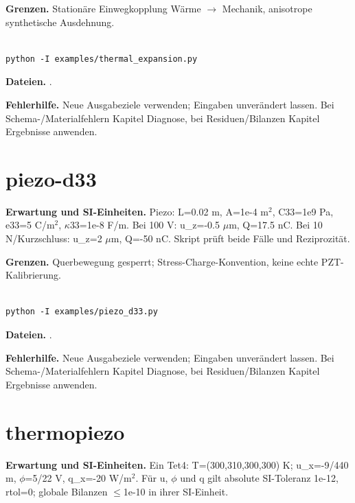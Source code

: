 \textbf{Grenzen.} Stationäre Einwegkopplung Wärme $\rightarrow$ Mechanik, anisotrope synthetische Ausdehnung.

\begin{lstlisting}

python -I examples/thermal_expansion.py

\end{lstlisting}

\textbf{Dateien.} .

\textbf{Fehlerhilfe.} Neue Ausgabeziele verwenden; Eingaben unverändert lassen. Bei Schema-/Materialfehlern Kapitel Diagnose, bei Residuen/Bilanzen Kapitel Ergebnisse anwenden.



\section{piezo-d33}\label{recipe:piezo-d33}

\textbf{Erwartung und SI-Einheiten.} Piezo: L=0.02 m, A=1e-4 m$^2$, C33=1e9 Pa, e33=5 C/m$^2$, $\kappa$33=1e-8 F/m. Bei 100 V: u\_z=-0.5 $\mu$m, Q=17.5 nC. Bei 10 N/Kurzschluss: u\_z=2 $\mu$m, Q=-50 nC. Skript prüft beide Fälle und Reziprozität.

\textbf{Grenzen.} Querbewegung gesperrt; Stress-Charge-Konvention, keine echte PZT-Kalibrierung.

\begin{lstlisting}

python -I examples/piezo_d33.py

\end{lstlisting}

\textbf{Dateien.} .

\textbf{Fehlerhilfe.} Neue Ausgabeziele verwenden; Eingaben unverändert lassen. Bei Schema-/Materialfehlern Kapitel Diagnose, bei Residuen/Bilanzen Kapitel Ergebnisse anwenden.



\section{thermopiezo}\label{recipe:thermopiezo}

\textbf{Erwartung und SI-Einheiten.} Ein Tet4: T=(300,310,300,300) K; u\_x=-9/440 m, $\phi$=5/22 V, q\_x=-20 W/m$^2$. Für u, $\phi$ und q gilt absolute SI-Toleranz 1e-12, rtol=0; globale Bilanzen $\leq$1e-10 in ihrer SI-Einheit.


